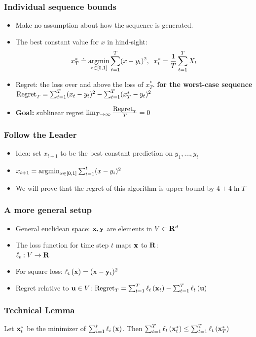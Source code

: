 \documentclass[handout]{beamer}
\begin{document}
\begin{frame}
\frametitle{Individual sequence bounds}
\begin{itemize}
\item Make no assumption about how the sequence is generated.
\item The best constant value for $x$ in hind-sight:\\
  $$x^*_T \doteq \argmin_{x \in [0,1]} \sum_{t=1}^T (x-y_t)^2,\;\; x^*_t=\frac{1}{T}
  \sum_{t=1}^T X_t$$ 
\item Regret: the loss over and above the loss of $x^*_T$. {\bf for the
    worst-case sequence}
  $ \regret_T = \sum_{t=1}^T (x_t-y_t)^2 - \sum_{t=1}^T (x^*_T-y_t)^2
  $
\item {\bf Goal:} sublinear regret $\lim_{T \to \infty} \frac{\regret_T}{T} = 0$
\end{itemize}
\end{frame}

\begin{frame}
\frametitle{Follow the Leader}
\begin{itemize}
\item Idea: set $x_{t+1}$ to be the best constant prediction on $y_1,\ldots,y_t$
\item 
  $x_{t+1} = \argmin_{x \in [0,1]} \sum_{i=1}^t (x-y_i)^2$ 
\item We will prove that the regret of this algorithm is upper bound
  by $4+4 \ln T$
\end{itemize}
\end{frame}

\begin{frame}
\frametitle{A more general setup}
\begin{itemize}
\item General euclidean space: $\vx,\vy$ are elements in $V \subset \RR^d$
\item The loss function for time step $t$ maps $\vx$ to $\RR$:\\
  $\ell_t: V \to \RR$
\item For square loss: $\elloss{\vx}{t} = (\vx -\vy_t)^2$
\item Regret relative to $\vu \in V$:
$\regret_T = \sum_{t=1}^T \elloss{\vx_t}{t} - \sum_{t=1}^T
  \elloss{\vu}{t} $
\end{itemize}
\end{frame}

\begin{frame}
\frametitle{Technical Lemma}
\begin{lemma}
  Let $\vx_t^*$ be the minimizer of $\sum_{i=1}^t \elloss{\vx}{i}$. Then
$  \sum_{t=1}^T \elloss{\vx_t^*}{t} \leq \sum_{t=1}^T \elloss{\vx_T^*}{t}$
  \end{lemma}
\end{frame}
\end{document}
